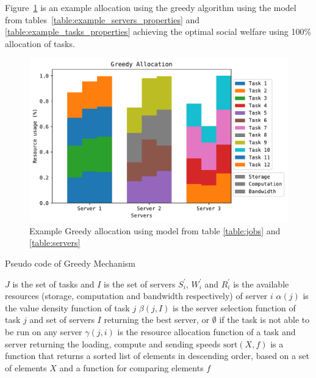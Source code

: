 Figure~\ref{fig:greedy_allocation} is an example allocation using the greedy algorithm using the model from
tables~\ref{table:example_servers_properties} and \ref{table:example_tasks_properties} achieving the optimal social
welfare using 100\% allocation of tasks. %
\begin{figure}[H]
    \includegraphics[width=\linewidth]{fig/allocation/greedy_allocation.pdf}
    \caption{Example Greedy allocation using model from table \ref{table:jobs} and \ref{table:servers}}
    \label{fig:greedy_allocation}
\end{figure}

\begin{algorithm}
    \caption{Pseudo code of Greedy Mechanism}
    \label{alg:greedy_mechanism}
    \begin{algorithmic}
        \REQUIRE $J$ is the set of tasks and $I$ is the set of servers
        \REQUIRE $S^{'}_i$, $W^{'}_i$ and $R^{'}_i$ is the available resources (storage, computation and bandwidth respectively) of server $i$
        \REQUIRE $\alpha(j)$ is the value density function of task $j$
        \REQUIRE $\beta(j, I)$ is the server selection function of task $j$ and set of servers $I$ returning the best server, or $\emptyset$ if the task is not able to be run on any server
        \REQUIRE $\gamma(j, i)$ is the resource allocation function of a task and server returning the loading, compute and sending speeds
        \REQUIRE $\text{sort}(X, f)$ is a function that returns a sorted list of elements in descending order, based on a set of elements $X$ and a function for comparing elements $f$
        
            \ENDIF
        \ENDFOR
    \end{algorithmic}
\end{algorithm}

